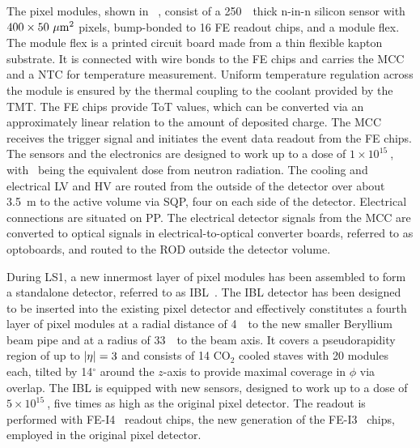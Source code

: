 %
The pixel modules, shown in \fig~, consist of a 250~\mum\ thick n-in-n silicon sensor with  $400\times50~\mu\mathrm{m}^2$ pixels, bump-bonded to 16 \gls{FE} readout chips, and a module flex. The module flex is a printed circuit board made from a thin flexible kapton substrate. It is connected with wire bonds to the \gls{FE} chips and carries the \gls{MCC} and a \gls{NTC} for temperature measurement. Uniform temperature regulation across the module is ensured by the thermal coupling to the coolant provided by the \gls{TMT}. The \gls{FE} chips provide \gls{ToT} values, which can be converted via an approximately linear relation to the amount of deposited charge. 
%
The \gls{MCC} receives the trigger signal and initiates the event data readout from the \gls{FE} chips. The sensors and the electronics are designed to work up to a dose of $1\times10^{15}~$\neqcm, with \neqcm\ being the equivalent dose from neutron radiation.
%
The cooling and electrical \gls{LV} and \gls{HV} are routed from the outside of the detector over about 3.5~m to the active volume via \gls{SQP}, four on each side of the detector. Electrical connections are situated on \gls{PP}.
The electrical detector signals from the \gls{MCC} are converted to optical signals in electrical-to-optical converter boards, referred to as optoboards, and routed to the \gls{ROD} outside the detector volume. 



During \gls{LS1}, a new innermost layer of pixel modules has been assembled to form a standalone detector, referred to as \gls{IBL}~\cite{IBL-TDR}.
%
The \gls{IBL} detector has been designed to be inserted into the existing pixel detector and effectively constitutes a fourth layer of pixel modules at a radial distance of 4~\mm\ to the new smaller Beryllium beam pipe and at a radius of 33~\mm\ to the beam axis. It covers a pseudorapidity region of up to $|\eta|=3$ and consists of 14 CO$_2$ cooled staves with 20 modules each, tilted by 14$^\circ$ around the $z$-axis to provide maximal coverage in $\phi$ via overlap. 
%
The \gls{IBL} is equipped with new sensors, designed to work up to a dose of $5\times10^{15}~$\neqcm, five times as high as the original pixel detector. 
%
The readout is performed with \gls{FE}-I4~\cite{GarciaSciveres2010} readout chips, the new generation of the \gls{FE}-I3~\cite{Peric2006178} chips, employed in the original pixel detector.

